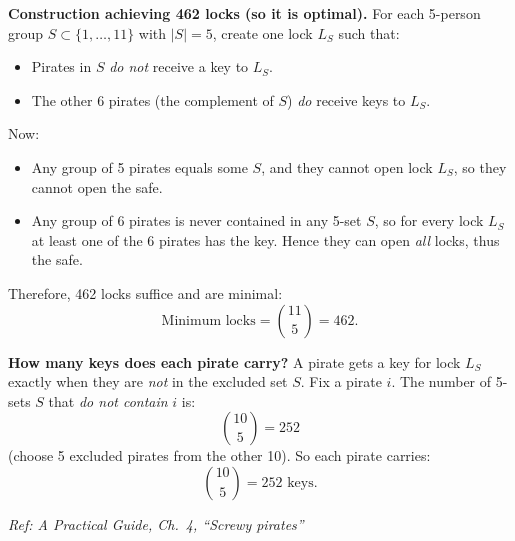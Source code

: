 \documentclass[11pt]{article}
\begin{document}
\begin{enumerate}[label=\textbf{\arabic*.}, resume]
\medskip
\noindent\textbf{Construction achieving 462 locks (so it is optimal).}
For each 5-person group $S\subset\{1,\dots,11\}$ with $|S|=5$, create one lock $L_S$ such that:
\begin{itemize}
\item Pirates in $S$ \emph{do not} receive a key to $L_S$.
\item The other 6 pirates (the complement of $S$) \emph{do} receive keys to $L_S$.
\end{itemize}
Now:
\begin{itemize}
\item Any group of 5 pirates equals some $S$, and they cannot open lock $L_S$, so they cannot open the safe.
\item Any group of 6 pirates is never contained in any 5-set $S$, so for every lock $L_S$ at least one of the 6 pirates has the key. Hence they can open \emph{all} locks, thus the safe.
\end{itemize}
Therefore, 462 locks suffice and are minimal:
\[
\boxed{\text{Minimum locks}=\binom{11}{5}=462.}
\]

\medskip
\noindent\textbf{How many keys does each pirate carry?}
A pirate gets a key for lock $L_S$ exactly when they are \emph{not} in the excluded set $S$.
Fix a pirate $i$. The number of 5-sets $S$ that \emph{do not contain} $i$ is:
\[
\binom{10}{5}=252
\]
(choose 5 excluded pirates from the other 10).
So each pirate carries:
\[
\boxed{\binom{10}{5}=252 \text{ keys.}}
\]

\hfill{\small\textit{Ref: A Practical Guide, Ch.\ 4, ``Screwy pirates''}}

\end{enumerate}
\end{document}
